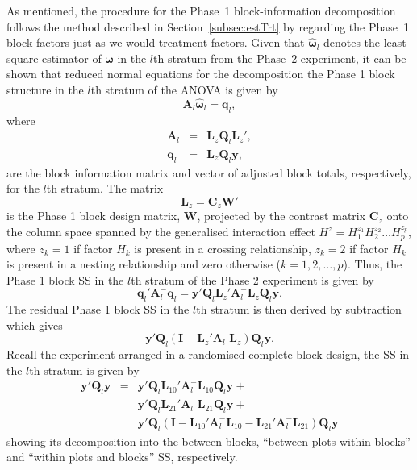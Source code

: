 \documentclass[article]{jss}
\newcommand{\I}{\mathbf{I}}
\newcommand{\Q}{\mathbf{Q}}
\newcommand{\A}{\mathbf{A}}
\newcommand{\C}{\mathbf{C}}
\newcommand{\mL}{\mathbf{L}}
\newcommand{\W}{\mathbf{W}}
\begin{document}
As mentioned, the procedure for the Phase~1 block-information decomposition follows the method described in Section~\ref{subsec:estTrt} by regarding the Phase~1 block factors just as we would treatment factors. Given that $\hat{\bm{\omega}}_{l}$ denotes the least square estimator of $\bm{\omega}$ in the $l$th stratum from the Phase~2 experiment, it can be shown that reduced normal equations for the decomposition the Phase 1 block structure in the $l$th stratum of the ANOVA is given by 
\begin{equation}\label{eq:blkReducedNormal}
\A_{l} \hat{\bm{\omega}}_{l} = \bm{q}_{l},
\end{equation}
where
\begin{eqnarray*}
\A_l &=& \mL_{z}\Q_l\mL_{z}',\\
\bm{q}_l &=& \mL_{z}\Q_l \bm{y},
\end{eqnarray*}
are the block information matrix and vector of adjusted block totals, respectively, for the $l$th stratum. The matrix 
\[
 \mL_{z} = \C_z \W'
\]
is the Phase 1 block design matrix, $\W$, projected by the contrast matrix $\C_z$ onto the column space spanned by the generalised interaction effect $H^{z} = H^{z_1}_1  H^{z_2}_2 \dots  H^{z_p}_p$, where $z_k = 1$ if factor $H_k$ is present in a crossing relationship, $z_k = 2$ if factor $H_k$ is present in a nesting relationship and zero otherwise ($k = 1,2, \dots, p$). Thus, the Phase 1 block SS in the $l$th stratum of the Phase 2 experiment is given by 
\begin{equation}\label{eq:blkSS}
 \bm{q}_{l}' \A_{l}^{-} \bm{q}_{l} = \bm{y}'\Q_l\mL_{z}' \A_{l}^{-} \mL_{z} \Q_l\bm{y}.
\end{equation}
The residual Phase 1 block SS in the $l$th stratum is then derived by subtraction which gives 
\[
\bm{y}'\Q_l(\I - \mL_{z}' \A_{l}^{-} \mL_{z}) \Q_l\bm{y}. 
\]
Recall the experiment arranged in a randomised complete block design, the SS in the $l$th stratum is given by 
\begin{eqnarray}
\bm{y}'\Q_l \bm{y} &=& \bm{y}'\Q_l\mL_{10}' \A_{l}^{-} \mL_{10} \Q_l\bm{y} + \\
					&& \bm{y}'\Q_l\mL_{21}' \A_{l}^{-} \mL_{21} \Q_l\bm{y} + \\
					&&\bm{y}'\Q_l(\I - \mL_{10}' \A_{l}^{-} \mL_{10} - \mL_{21}' \A_{l}^{-} \mL_{21}) \Q_l\bm{y}
\end{eqnarray}
showing its decomposition into the between blocks, ``between plots within blocks'' and ``within plots and blocks'' SS, respectively.  
\end{document}
